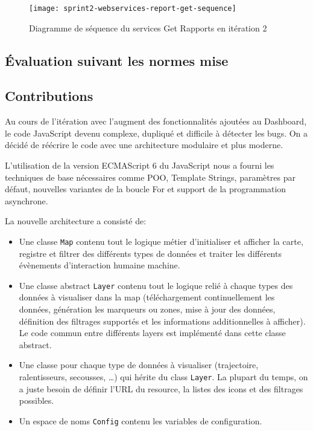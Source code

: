 \begin{figure}[htbp]
    \centering
    \texttt{[image: sprint2-webservices-report-get-sequence]}
    \caption{Diagramme de séquence du services Get Rapports en itération 2}
\end{figure}

\subsection{Évaluation suivant les normes mise}


\subsection{Contributions}

Au cours de l'itération avec l'augment des fonctionnalités ajoutées au
Dashboard, le code JavaScript devenu complexe, dupliqué et difficile à détecter
les bugs. On a décidé de réécrire le code avec une architecture modulaire et
plus moderne.

L'utilisation de la version ECMAScript 6 du JavaScript nous a fourni les
techniques de base nécessaires comme POO, Template Strings, paramètres par
défaut, nouvelles variantes de la boucle For et support de la programmation
asynchrone.


La nouvelle architecture a consisté de:
\begin{itemize}
    \item Une classe \verb|Map| contenu tout le logique métier d'initialiser et
        afficher la carte, registre et filtrer des différents types de données
        et traiter les différents évènements d'interaction humaine machine.
    \item Une classe abstract \verb|Layer| contenu tout le logique relié à
        chaque types des données à visualiser dans la map (téléchargement
        continuellement les données, génération les marqueurs ou zones, mise à
        jour des données, définition des filtrages supportés et les
        informations additionnelles à afficher). Le code commun entre différents
        layers est implémenté dans cette classe abstract.
    \item Une classe pour chaque type de données à visualiser (trajectoire,
        ralentisseurs, secousses, \ldots) qui hérite du class \verb|Layer|. La
        plupart du temps, on a juste besoin de définir l'URL du resource, la
        listes des icons et des filtrages possibles.
    \item Un espace de noms \verb|Config| contenu les variables de
        configuration.
\end{itemize}

